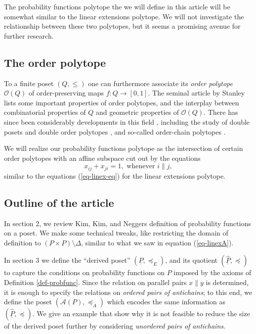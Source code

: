 \documentclass[11pt,a4paper,abstract=yes]{scrartcl}
\theoremstyle{plain}
\newcommand{\orderpolytope}[1]{\mathcal{O}({#1})}
\newcommand{\transerel}{\preceq_{E}}
\newcommand{\twoanti}[1]{\mathcal{A}({#1})}
\newcommand{\transterel}{\preceq_{A}}
\newcommand{\Pairs}[1]{\underline{#1}}
\newcommand{\Ppairs}{\Pairs{P}}
\newcommand{\PairsQuotient}[1]{\widehat{\Pairs{#1}}}
\newcommand{\Pqu}{\PairsQuotient{P}}
\newcommand{\pqurel}{\preceq}
\begin{document}
The probability functions polytope the we will define in this article will be somewhat similar to the linear extensions
polytope. We will not investigate the relationship between these two polytopes, but it seems
a promising avenue for further research.
\subsection{The order polytope}
\label{sec:orgdec1c22}
To a finite poset \((Q,\le)\) one can furthermore associate its \emph{order polytope} \(\orderpolytope{Q}\)
of order-preserving maps \(f: Q \to [0,1]\). The seminal article by Stanley \autocite{StanleyTwoPosetPolytopes}
lists some important properties of order polytopes, and the interplay between combinatorial
properties of \(Q\) and geometric properties of \(\orderpolytope{Q}\). There has since been considerably
developments in this field \autocite{HibiCutting}\autocite{HibiEdgesOrderpolytope}\autocite{vonBellTriangulationsOrderpolytopes}\autocite{AhmadOrderChain}\autocite{Freij-Hollanti_Lundström_2024}\autocite{HibiUnimodularOrderpolytopes}, including the study of double posets and double order polytopes \autocite{https://doi.org/10.37236/8381}\autocite{https://doi.org/10.1137/16m1091800}, and so-called
order-chain polytopes \autocite{https://doi.org/10.1016/j.ejc.2016.06.007}.

We will realize our probability functions polytope as the intersection of certain order polytopes with an affine subspace
cut out by the equations
\[  x_{ij} + x_{ji} = 1, \text{ whenever } i \parallel j,\]
similar to the equations (\ref{eq-linex-eq}) for the  linear extensions polytope.
\subsection{Outline of the article}
\label{sec:org693ca3b}
In section 2, we review Kim, Kim, and Neggers definition of probability functions on a poset.
We make some technical tweaks, like restricting the domain of definition to \((P \times P) \setminus \Delta\),
similar to what we saw in equation (\ref{eq-linexA}).

In section 3 we define the ``derived poset'' \((\Ppairs, \transerel)\), and its quotient
\((\Pqu, \pqurel)\) to capture the conditions on probability functions on \(P\) imposed by the
axioms of Definition \ref{def-probfunc}. Since the relation on parallel pairs \(x \parallel y\) is determined,
it is enough to specify the relations on \emph{ordered pairs of antichains}; to this end,
we define the poset \((\twoanti{P},\transterel)\) which encodes the same information as \((\Pqu, \pqurel)\).
We give an example that show why it is not feasible to reduce the size of the derived poset
further by considering \emph{unordered pairs of antichains}.
\end{document}
